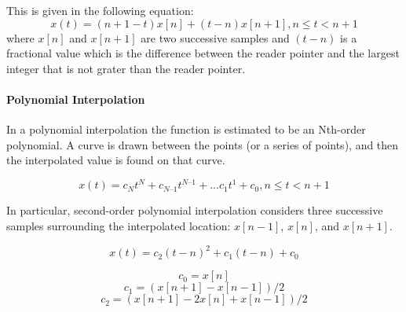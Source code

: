 This is given in the following equation:
\[
 x(t) = (n + 1 - t)x[n] + (t-n)x[n+1], 				n \leq t< n + 1
\]
where $x[n]$ and $x[n+1]$ are two successive  samples and $ (t-n) $ is a fractional value which is the difference between the reader pointer and the largest integer that is not grater than the reader pointer.

\paragraph{Polynomial Interpolation}
In a polynomial interpolation the function is estimated to be an Nth-order polynomial. A curve is drawn between the points (or a series of points), and then the interpolated value is found on that curve.~\cite{pirkle2013designing}

\[
 x(t) = c_{N}t^{N} + c_{N–1}t^{N–1} + ... c_{1}t^{1} + c_{0}, 				n \leq t< n + 1
 \]

In particular, second-order polynomial interpolation considers three successive samples surrounding the interpolated location: $x[n-1]$, $x[n]$, and $x[n+1]$. 

\[
x(t) = c_{2}(t-n)^{2} + c_{1}(t-n) + c_{0}
\]

\[
c_{0} = x[n]
\]
\[
c_{1} = (x[n+1] - x[n-1])/2
\]
\[
c_{2} = (x[n+1] - 2x[n] + x[n-1])/2
\]



